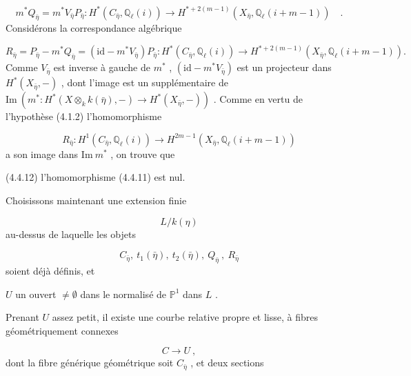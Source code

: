 
\begin{equation}\tag{4.4.9}
 m^*Q_{\bar\eta} = m^*V_{\bar\eta} P_{\bar\eta} : H^*(C_{\bar\eta}, \mathbb{Q}_\ell(i)) \longrightarrow H^{*+2(m-1)}(X_{\bar\eta},\mathbb{Q}_\ell(i+m-1)) \quad .
\end{equation}
Considérons la correspondance algébrique

\begin{equation}\tag{4.4.10}
R_{\bar\eta} = P_{\bar\eta} - m^*Q_{\bar\eta} = (\mathrm{id}-m^*V_{\bar\eta})P_{\bar\eta} : H^*(C_{\bar\eta},\mathbb{Q}_\ell(i)) \longrightarrow H^{*+2(m-1)}(X_{\bar\eta},\mathbb{Q}_\ell(i+m-1)).
\end{equation}
Comme $V_{\bar\eta}$ est inverse à gauche de $m^*$ , $(\mathrm{id}-m^*V_{\bar\eta})$ est un projecteur dans $H^*(X_{\bar\eta}, -)$ , dont l'image est un supplémentaire de $\mathrm{Im}\ (m^* : H^*(X \otimes_k k(\bar\eta),-) \longrightarrow H^*(X_{\bar\eta},-))$ . Comme en vertu de l'hypothèse (4.1.2) l'homomorphisme

\begin{equation}\tag{4.4.11}
R_{\bar\eta} : H^1(C_{\bar\eta},\mathbb{Q}_\ell(i)) \longrightarrow H^{2m-1}(X_{\bar\eta},\mathbb{Q}_\ell(i+m-1))
\end{equation}
a son image dans $\mathrm{Im}\ m^*$ , on trouve que

(4.4.12) \quad l'homomorphisme (4.4.11) est nul.

Choisissons maintenant une extension finie

\begin{equation*}
L/k(\eta)
\end{equation*}
au-dessus de laquelle les objets

\begin{equation*}
C_{\bar\eta}, \ t_1(\bar\eta), \ t_2(\bar\eta), \ Q_{\bar\eta} \ , \ R_{\bar\eta}
\end{equation*}
soient déjà définis, et

$U$  un ouvert $\neq \emptyset$  dans le normalisé de $\mathbb{P}^1$  dans  $L$ .

Prenant $U$ assez petit, il existe une courbe relative propre et lisse, à fibres géométriquement connexes 



\begin{equation*}
 C \longrightarrow U \ ,
\end{equation*}
dont la fibre générique géométrique soit $C_{\bar\eta}$ , et deux sections

